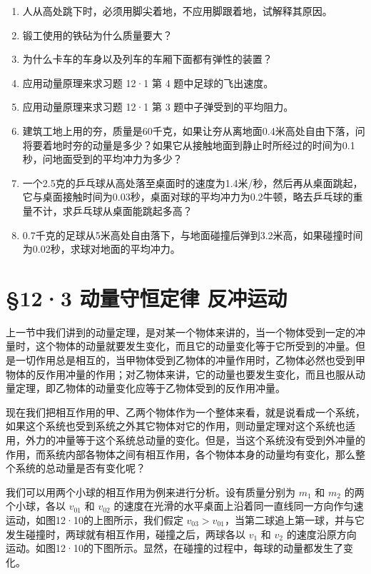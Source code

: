 \begin{enumerate}
\def\labelenumi{\arabic{enumi}.}
\item
  人从高处跳下时，必须用脚尖着地，不应用脚跟着地，试解释其原因。
\item
  锻工使用的铁砧为什么质量要大？
\item
  为什么卡车的车身以及列车的车厢下面都有弹性的装置？
\item
  应用动量原理来求习题 12·1 第 4 题中足球的飞出速度。
\item
  应用动量原理来求习题 12·1 第 3 题中子弹受到的平均阻力。
\item
  建筑工地上用的夯，质量是60千克，如果让夯从离地面0.4米高处自由下落，问将要着地时夯的动量是多少？如果它从接触地面到静止时所经过的时间为0.1秒，问地面受到的平均冲力为多少？
\item
  一个2.5克的乒乓球从高处落至桌面时的速度为1.4米/秒，然后再从桌面跳起，它与桌面接触时间为0.03秒，桌面对球的平均冲力为0.2牛顿，略去乒乓球的重量不计，求乒乓球从桌面能跳起多高？
\item
  0.7千克的足球从5米高处自由落下，与地面碰撞后弹到3.2米高，如果碰撞时间为0.02秒，求球对地面的平均冲力。
\end{enumerate}

\section{§12·3 动量守恒定律
反冲运动}\label{ux52a8ux91cfux5b88ux6052ux5b9aux5f8b-ux53cdux51b2ux8fd0ux52a8}

上一节中我们讲到的动量定理，是对某一个物体来讲的，当一个物体受到一定的冲量时，这个物体的动量就要发生变化，而且它的动量变化等于它所受到的冲量。但是一切作用总是相互的，当甲物体受到乙物体的冲量作用时，乙物体必然也受到甲物体的反作用冲量的作用；对乙物体来讲，它的动量也要发生变化，而且也服从动量定理，即乙物体的动量变化应等于乙物体受到的反作用冲量。

现在我们把相互作用的甲、乙两个物体作为一个整体来看，就是说看成一个系统，如果这个系统也受到系统之外其它物体对它的作用，则动量定理对这个系统也适用，外力的冲量等于这个系统总动量的变化。但是，当这个系统没有受到外冲量的作用，而系统内部各物体之间有相互作用，各个物体本身的动量均有变化，那么整个系统的总动量是否有变化呢？

我们可以用两个小球的相互作用为例来进行分析。设有质量分别为 \(m_{1}\) 和
\(m_{2}\) 的两个小球，各以 \(v_{01}\) 和 \(v_{02}\)
的速度在光滑的水平桌面上沿着同一直线同一方向作匀速运动，如图12·10的上图所示，我们假定
\(v_{03} > v_{01}\)，当第二球追上第一球，并与它发生碰撞时，两球就有相互作用，碰撞之后，两球各以
\(v_{1}\) 和 \(v_{2}\)
的速度沿原方向运动。如图12·10的下图所示。显然，在碰撞的过程中，每球的动量都发生了变化。

